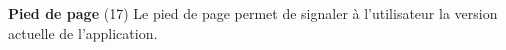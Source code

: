 \textbf{Pied de page} (17)\newline
Le pied de page permet de signaler à l'utilisateur la version actuelle de l'application.







